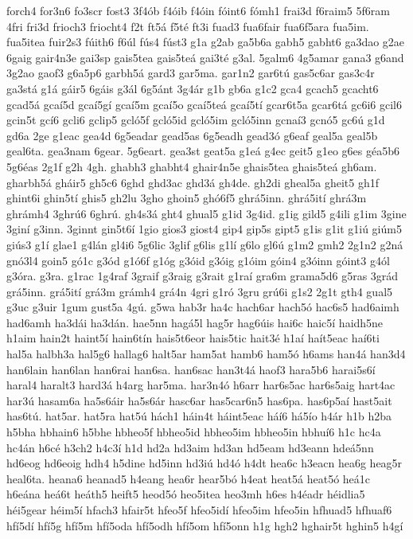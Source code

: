 {forch4
for3n6
fo3scr
fost3
3f4ób
f4óib
f4óin
fóint6
fómh1
frai3d
f6raim5
5f6ram
4fri
fri3d
frioch3
friocht4
f2t
ft5á
f5té
ft3i
fuad3
fua6fair
fua6f5ara
fua5im.
fua5itea
fuir2s3
fúith6
f6úl
fús4
fúst3
g1a
g2ab
ga5b6a
gabh5
gabht6
ga3dao
g2ae
6gaig
gair4n3e
gai3sp
gais5tea
gais5teá
gai3té
g3al.
5galm6
4g5amar
gana3
g6and
3g2ao
gaof3
g6a5p6
garbh5á
gard3
gar5ma.
gar1n2
gar6tú
gas5c6ar
gas3c4r
ga3stá
g1á
gáir5
6gáis
g3ál
6g5ánt
3g4ár
g1b
gb6a
g1c2
gca4
gcach5
gcacht6
gcad5á
gcaí5d
gcaí5gí
gcaí5m
gcaí5o
gcaí5teá
gcaí5tí
gcar6t5a
gcar6tá
gc6i6
gcil6
gcin5t
gcí6
gcli6
gclip5
gcló5f
gcló5id
gcló5im
gcló5inn
gcnaí3
gcnó5
gc6ú
g1d
gd6a
2ge
g1eac
gea4d
6g5eadar
gead5as
6g5eadh
gead3ó
g6eaf
geal5a
geal5b
geal6ta.
gea3nam
6gear.
5g6eart.
gea3st
geat5a
g1eá
g4ec
geit5
g1eo
g6es
géa5b6
5g6éas
2g1f
g2h
4gh.
ghabh3
ghabht4
ghair4n5e
ghais5tea
ghais5teá
gh6am.
gharbh5á
gháir5
gh5c6
6ghd
ghd3ac
ghd3á
gh4de.
gh2di
gheal5a
gheit5
gh1f
ghint6i
ghin5tí
ghis5
gh2lu
3gho
ghoin5
ghó6f5
ghrá5inn.
ghrá5ití
ghrá3m
ghrámh4
3ghrú6
6ghrú.
gh4s3á
ght4
ghual5
g1id
3g4id.
g1ig
gild5
g4ili
g1im
3gine
3giní
g3inn.
3ginnt
gin5t6í
1gio
gios3
giost4
gip4
gip5s
gipt5
g1is
g1it
g1iú
giúm5
giús3
g1í
glae1
g4lán
gl4i6
5g6lic
3glif
g6lis
g1lí
g6lo
gl6ú
g1m2
gmh2
2g1n2
g2ná
gnó3l4
goin5
gó1c
g3ód
g1ó6f
g1óg
g3óid
g3óig
g1óim
góin4
g3óinn
góint3
g4ól
g3óra.
g3ra.
g1rac
1g4raf
3graif
g3raig
g3rait
g1raí
gra6m
grama5d6
g5ras
3grád
grá5inn.
grá5ití
grá3m
grámh4
grá4n
4gri
g1ró
3gru
grú6i
g1s2
2g1t
gth4
gual5
g3uc
g3uir
1gum
gust5a
4gú.
g5wa
hab3r
ha4c
hach6ar
hach5ó
hac6s5
had6aimh
had6amh
ha3dái
ha3dán.
hae5nn
hagá5l
hag5r
hag6úis
hai6c
haic5í
haidh5ne
h1aim
hain2t
haint5í
hain6tín
hais5t6eor
hais5tic
hait3é
h1aí
haít5eac
haí6ti
hal5a
halbh3a
hal5g6
hallag6
halt5ar
ham5at
hamb6
ham5ó
h6ams
han4á
han3d4
han6lain
han6lan
han6rai
han6sa.
han6sac
han3t4á
haof3
hara5b6
harai5s6í
haral4
haralt3
hard3á
h4arg
har5ma.
har3n4ó
h6arr
har6s5ac
har6s5aig
hart4ac
har3ú
hasam6a
ha5s6áir
ha5s6ár
hasc6ar
has5car6n5
has6pa.
has6p5aí
hast5ait
has6tú.
hat5ar.
hat5ra
hat5ú
hách1
háin4t
háint5eac
háí6
há5ío
h4ár
h1b
h2ba
h5bha
hbhain6
h5bhe
hbheo5f
hbheo5id
hbheo5im
hbheo5in
hbhuí6
h1c
hc4a
hc4án
h6cé
h3ch2
h4c3í
h1d
hd2a
hd3aim
hd3an
hd5eam
hd3eann
hdeá5nn
hd6eog
hd6eoig
hdh4
h5dine
hd5inn
hd3iú
hd4ó
h4dt
hea6c
h3eacn
hea6g
heag5r
heal6ta.
heana6
heanad5
h4eang
hea6r
hear5bó
h4eat
heat5á
heat5ó
heá1c
h6eána
heá6t
heáth5
heift5
heod5ó
heo5itea
heo3mh
h6es
h4éadr
héidlia5
héi5gear
héim5í
hfach3
hfair5t
hfeo5f
hfeo5idí
hfeo5im
hfeo5in
hfhuad5
hfhuaf6
hfí5dí
hfí5g
hfí5m
hfí5oda
hfí5odh
hfí5om
hfí5onn
h1g
hgh2
hghair5t
hghin5
h4gí
}
